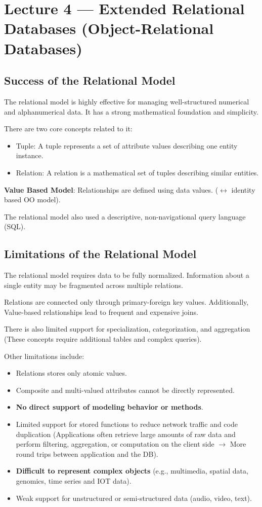 \documentclass[11pt]{article}
\newcommand{\topsec}[1]{
    \vspace{11pt}
    \section{#1}
    \vspace{11pt}
}
\newcommand{\subsec}[1]{
    \vspace{11pt}
    \subsection{#1}
    \vspace{11pt}
}
\begin{document}
\newpage

\topsec{Lecture 4 --- Extended Relational Databases (Object-Relational Databases)}

\subsec{Success of the Relational Model}

The relational model is highly effective for managing well-structured numerical and alphanumerical data. It has a strong mathematical foundation and simplicity.

There are two core concepts related to it:
\begin{itemize}
    \item Tuple: A tuple represents a set of attribute values describing one entity instance.
    \item Relation: A relation is a mathematical set of tuples describing similar entities.
\end{itemize}
\vspace{11pt}

\textbf{Value Based Model}: Relationships are defined using data values. ($\leftrightarrow$ identity based OO model).

The relational model also used a descriptive, non-navigational query language (SQL).

\subsec{Limitations of the Relational Model}

The relational model requires data to be fully normalized. Information about a single entity may be fragmented across multiple relations.

Relations are connected only through primary-foreign key values. Additionally, Value-based relationships lead to frequent and expensive joins.

There is also limited support for specialization, categorization, and aggregation (These concepts require additional tables and complex queries).

\vspace{11pt}
Other limitations include:
\begin{itemize}
    \item Relations stores only atomic values.
    \item Composite and multi-valued attributes cannot be directly represented.
    \item \textbf{No direct support of modeling behavior or methods}.
    \item Limited support for stored functions to reduce network traffic and code duplication (Applications often retrieve large amounts of raw data and perform filtering, aggregation, or computation on the client side $\to$ More round trips between application and the DB).
    \item \textbf{Difficult to represent complex objects} (e.g., multimedia, spatial data, genomics, time series and IOT data).
    \item Weak support for unstructured or semi-structured data (audio, video, text).
\end{itemize}
\vspace{11pt}
\end{document}
